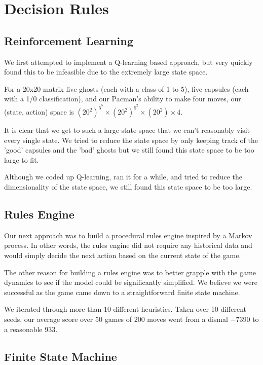 \documentclass[11pt, oneside]{article}   	%
\begin{document}
\section{Decision Rules}

\subsection{Reinforcement Learning}
We first attempted to implement a Q-learning based approach\cite{sutton}, but very quickly found this to be infeasible due to the extremely large state space.

For a 20x20 matrix five ghosts (each with a class of 1 to 5), five capsules (each with a 1/0 classification), and our Pacman's ability to make four moves, our (state, action) space is $(20^2)^{5^5} \times (20^2)^{5^2} \times (20^2) \times 4$.

It is clear that we get to such a large state space that we can't reasonably visit every single state. We tried to reduce the state space by only keeping track of the 'good' capsules and the 'bad' ghosts but we still found this state space to be too large to fit. 

Although we coded up Q-learning, ran it for a while, and tried to reduce the dimensionality of the state space, we still found this state space to be too large.

\subsection{Rules Engine}
Our next approach was to build a procedural rules engine inspired by a Markov process. In other words, the rules engine did not require any historical data and would simply decide the next action based on the current state of the game.

The other reason for building a rules engine was to better grapple with the game dynamics to see if the model could be significantly simplified. We believe we were successful as the game came down to a straightforward finite state machine. 

We iterated through more than 10 different heuristics. Taken over 10 different seeds, our average score over 50 games of 200 moves went from a dismal $-7390$ to a reasonable $933$.

\subsection{Finite State Machine}
\end{document}

